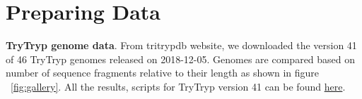 \documentclass[
10pt, %
a4paper, %
oneside, %
headinclude,footinclude, %
BCOR5mm, %
]{scrartcl}
\title{\normalfont\spacedallcaps{}} %
\begin{document}

\renewcommand{\sectionmark}[1]{\markright{\spacedlowsmallcaps{#1}}} %
\lehead{\mbox{\llap{\small\thepage\kern1em\color{halfgray} \vline}\color{halfgray}\hspace{0.5em}\rightmark\hfil}} %

\pagestyle{scrheadings} %



\setcounter{tocdepth}{3} %

\tableofcontents %




\newpage 


\section{Preparing Data}
\textbf{TryTryp genome data}. From tritrypdb website, we downloaded the version 41 of 46 TryTryp genomes released on 2018-12-05. Genomes are compared based on number of sequence fragments relative to their length as shown in figure ~\vref{fig:gallery}. 
All the results, scripts for TryTryp version 41 can be found \href{https://github.com/fhadinezhadUC/Leishmania_2019}{here}. 
\end{document}
